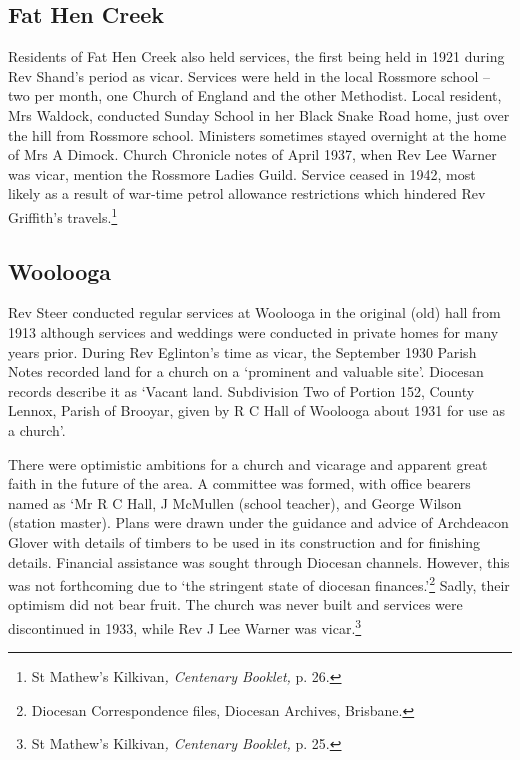 \subsection{Fat Hen Creek}



Residents of Fat Hen Creek also held services, the first being held in 1921 during Rev Shand's period as vicar. Services were held in the local Rossmore school -- two per month, one Church of England and the other Methodist. Local resident, Mrs Waldock, conducted Sunday School in her Black Snake Road home, just over the hill from Rossmore school. Ministers sometimes stayed overnight at the home of Mrs A Dimock. Church Chronicle notes of April 1937, when Rev Lee Warner was vicar, mention the Rossmore Ladies Guild. Service ceased in 1942, most likely as a result of war-time petrol allowance restrictions which hindered Rev Griffith's travels.\footnote{St Mathew's Kilkivan\emph{, Centenary Booklet,} p. 26.}


\subsection{Woolooga}



Rev Steer conducted regular services at Woolooga in the original (old) hall from 1913 although services and weddings were conducted in private homes for many years prior. During Rev Eglinton's time as vicar, the September 1930 Parish Notes recorded land for a church on a `prominent and valuable site'. Diocesan records describe it as `Vacant land. Subdivision Two of Portion 152, County Lennox, Parish of Brooyar, given by R C Hall of Woolooga about 1931 for use as a church'.



There were optimistic ambitions for a church and vicarage and apparent great faith in the future of the area. A committee was formed, with office bearers named as `Mr R C Hall, J McMullen (school teacher), and George Wilson (station master). Plans were drawn under the guidance and advice of Archdeacon Glover with details of timbers to be used in its construction and for finishing details. Financial assistance was sought through Diocesan channels. However, this was not forthcoming due to `the stringent state of diocesan finances.'\footnote{Diocesan Correspondence files, Diocesan Archives, Brisbane.} Sadly, their optimism did not bear fruit. The church was never built and services were discontinued in 1933, while Rev J Lee Warner was vicar.\footnote{St Mathew's Kilkivan\emph{, Centenary Booklet,} p. 25.}



